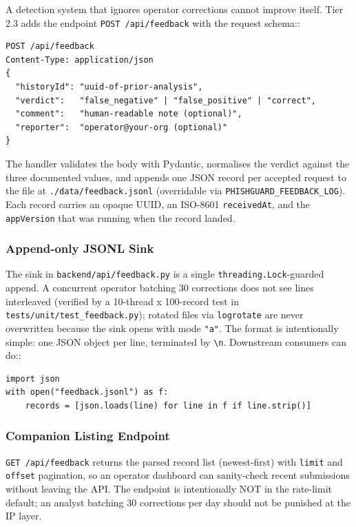 A detection system that ignores operator corrections cannot improve itself. Tier 2.3 adds the endpoint \texttt{POST /api/feedback} with the request schema::

\begin{verbatim}
POST /api/feedback
Content-Type: application/json
{
  "historyId": "uuid-of-prior-analysis",
  "verdict":   "false_negative" | "false_positive" | "correct",
  "comment":   "human-readable note (optional)",
  "reporter":  "operator@your-org (optional)"
}
\end{verbatim}

The handler validates the body with Pydantic, normalises the verdict against the three documented values, and appends one JSON record per accepted request to the file at \texttt{./data/feedback.jsonl} (overridable via \texttt{PHISHGUARD\_FEEDBACK\_LOG}). Each record carries an opaque UUID, an ISO-8601 \texttt{receivedAt}, and the \texttt{appVersion} that was running when the record landed.

\subsubsection{Append-only JSONL Sink}

The sink in \texttt{backend/api/feedback.py} is a single \texttt{threading.Lock}-guarded append. A concurrent operator batching 30 corrections does not see lines interleaved (verified by a 10-thread x 100-record test in \texttt{tests/unit/test\_feedback.py}); rotated files via \verb|logrotate| are never overwritten because the sink opens with mode \verb|"a"|. The format is intentionally simple: one JSON object per line, terminated by \texttt{\textbackslash n}. Downstream consumers can do::

\begin{verbatim}
import json
with open("feedback.jsonl") as f:
    records = [json.loads(line) for line in f if line.strip()]
\end{verbatim}

\subsubsection{Companion Listing Endpoint}

\texttt{GET /api/feedback} returns the parsed record list (newest-first) with \texttt{limit} and \texttt{offset} pagination, so an operator dashboard can sanity-check recent submissions without leaving the API. The endpoint is intentionally NOT in the rate-limit default; an analyst batching 30 corrections per day should not be punished at the IP layer.


